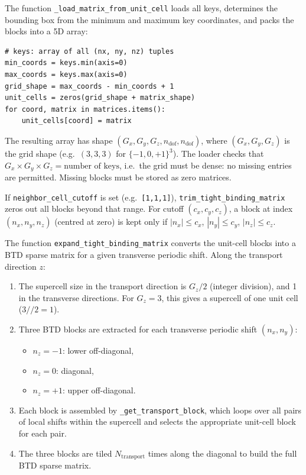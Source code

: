 The function \texttt{\_load\_matrix\_from\_unit\_cell} loads all keys,
determines the bounding box from the minimum and maximum key
coordinates, and packs the blocks into a 5D array:
\begin{lstlisting}
# keys: array of all (nx, ny, nz) tuples
min_coords = keys.min(axis=0)
max_coords = keys.max(axis=0)
grid_shape = max_coords - min_coords + 1
unit_cells = zeros(grid_shape + matrix_shape)
for coord, matrix in matrices.items():
    unit_cells[coord] = matrix
\end{lstlisting}
The resulting array has shape
$(G_x,G_y,G_z,n_\mathrm{dof},n_\mathrm{dof})$, where
$(G_x,G_y,G_z)$ is the grid shape (e.g.\ $(3,3,3)$ for
$\{-1,0,+1\}^3$).  The loader checks that
$G_x \times G_y \times G_z = \text{number of keys}$, i.e.\ the grid
must be dense: no missing entries are permitted.  Missing blocks must
be stored as zero matrices.

If \texttt{neighbor\_cell\_cutoff} is set (e.g.\ \texttt{[1,1,1]}),
\texttt{trim\_tight\_binding\_matrix} zeros out all blocks beyond that
range.  For cutoff $(c_x,c_y,c_z)$, a block at index
$(n_x,n_y,n_z)$ (centred at zero) is kept only if
$|n_x| \le c_x$, $|n_y| \le c_y$, $|n_z| \le c_z$.

The function \texttt{expand\_tight\_binding\_matrix} converts the
unit-cell blocks into a BTD sparse matrix for a given transverse
periodic shift.  Along the transport direction $z$:
\begin{enumerate}
  \item The supercell size in the transport direction is $G_z / 2$
        (integer division), and 1 in the transverse directions.  For
        $G_z = 3$, this gives a supercell of one unit cell
        ($3 // 2 = 1$).
  \item Three BTD blocks are extracted for each transverse periodic
        shift $(n_x,n_y)$:
        \begin{itemize}
          \item $n_z=-1$: lower off-diagonal,
          \item $n_z=0$: diagonal,
          \item $n_z=+1$: upper off-diagonal.
        \end{itemize}
  \item Each block is assembled by \texttt{\_get\_transport\_block},
        which loops over all pairs of local shifts within the supercell
        and selects the appropriate unit-cell block for each pair.
  \item The three blocks are tiled $N_\text{transport}$ times along the
        diagonal to build the full BTD sparse matrix.
\end{enumerate}

